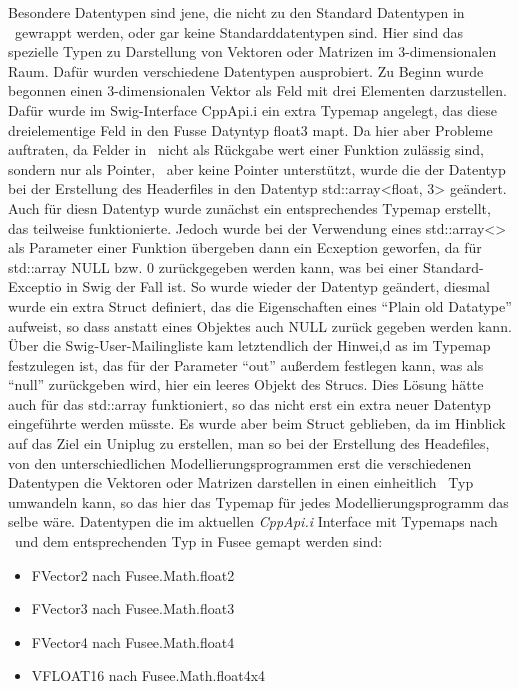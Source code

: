 Besondere Datentypen sind jene, die nicht zu den Standard Datentypen in \CS~gewrappt werden, oder gar keine Standarddatentypen sind. Hier sind das spezielle Typen zu Darstellung von Vektoren oder Matrizen im 3-dimensionalen Raum. Dafür wurden verschiedene Datentypen ausprobiert. Zu Beginn wurde begonnen einen 3-dimensionalen Vektor als Feld mit drei Elementen darzustellen. Dafür wurde im Swig-Interface CppApi.i ein extra Typemap angelegt, das diese dreielementige Feld in den Fusse Datyntyp float3 mapt. Da hier aber Probleme auftraten, da Felder in \CC~nicht als Rückgabe wert einer Funktion zulässig sind, sondern nur als Pointer, \CS~aber keine Pointer unterstützt, wurde die der Datentyp bei der Erstellung des Headerfiles in den Datentyp std::array<float, 3> geändert. Auch für diesn Datentyp wurde zunächst ein entsprechendes Typemap erstellt, das teilweise funktionierte. Jedoch wurde bei der Verwendung eines std::array<> als Parameter einer Funktion übergeben dann ein Ecxeption geworfen, da für std::array  NULL bzw. 0 zurückgegeben werden kann, was bei einer Standard-Exceptio in Swig der Fall ist. So wurde wieder der Datentyp geändert, diesmal wurde ein extra Struct definiert, das die Eigenschaften eines \enquote{Plain old Datatype} aufweist, so dass anstatt eines Objektes auch NULL zurück gegeben werden kann. Über die Swig-User-Mailingliste kam letztendlich der Hinwei,d as im Typemap festzulegen ist, das für der Parameter \enquote{out} außerdem festlegen kann, was als \enquote{null} zurückgeben wird, hier ein leeres Objekt des Strucs. Dies Lösung hätte auch für das std::array funktioniert, so das nicht erst ein extra neuer Datentyp eingeführte werden müsste. Es wurde aber beim Struct geblieben, da im Hinblick auf das Ziel ein Uniplug zu erstellen, man so bei der Erstellung des Headefiles, von den unterschiedlichen Modellierungsprogrammen erst die verschiedenen Datentypen die Vektoren oder Matrizen darstellen in einen einheitlich \CC~Typ umwandeln kann, so das hier das Typemap für jedes Modellierungsprogramm das selbe wäre. 
Datentypen die im aktuellen \emph{CppApi.i} Interface mit Typemaps nach \CS~und dem entsprechenden Typ in Fusee gemapt werden sind:\\
\begin{itemize}
	\item FVector2 nach Fusee.Math.float2
	\item FVector3 nach Fusee.Math.float3
	\item FVector4 nach Fusee.Math.float4
	\item VFLOAT16 nach Fusee.Math.float4x4
\end{itemize}

